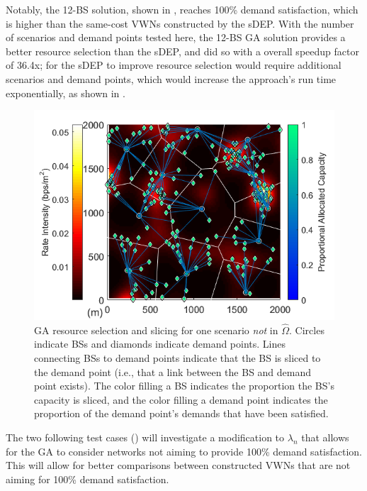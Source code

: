 \documentclass[12pt,dvipsnames]{report}
\begin{document}
Notably, the 12-BS solution, shown in , reaches 100\% demand satisfaction, which is higher than the same-cost VWNs constructed by the sDEP.  With the number of scenarios and demand points tested here, the 12-BS GA solution provides a better resource selection than the sDEP, and did so with a overall speedup factor of 36.4x; for the sDEP to improve resource selection would require additional scenarios and demand points, which would increase the approach's run time exponentially, as shown in .

\begin{figure}[htp]
	\centering
	\includegraphics[height=0.4\textheight]{Figures/Prelim_VoronoiDemandAllocation_GA_12BS_snip2}
	\caption[One preliminary simulations GA resource selection and slicing solution]{GA resource selection and slicing for one scenario \emph{not} in $\hat{\Omega}$.  Circles indicate BSs and diamonds indicate demand points.  Lines connecting BSs to demand points indicate that the BS is sliced to the demand point (i.e., that a link between the BS and demand point exists).  The color filling a BS indicates the proportion the BS's capacity is sliced, and the color filling a demand point indicates the proportion of the demand point's demands that have been satisfied.}
	\label{fig:Prelim_VorDemAlloc_GA}
\end{figure}

The two following test cases () will investigate a modification to $\lambda_n$ that allows for the GA to consider networks not aiming to provide 100\% demand satisfaction.  This will allow for better comparisons between constructed VWNs that are not aiming for 100\% demand satisfaction.
\end{document}
